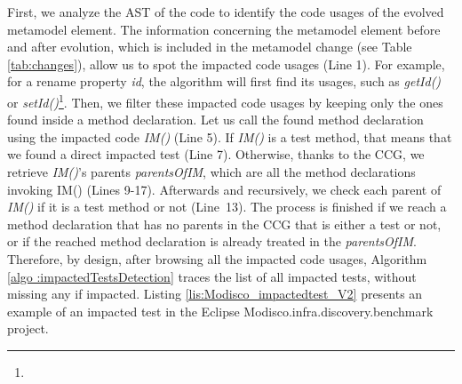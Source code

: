 First, we analyze the AST of the code to identify the code usages of the evolved metamodel element. The information concerning the metamodel element before and after evolution, which is included in the metamodel change (see Table \ref{tab:changes}), allow us to spot the impacted code usages (Line 1). For example, for a rename property \emph{id}, the algorithm will first find its usages, such as \emph{getId()} or \emph{setId()}\footnote{}. 
%
Then, we filter these impacted code usages by keeping only the ones found inside a method declaration. %
Let us call the found method declaration using the impacted code \textit{IM()} (Line 5). If \textit{IM()} is a test method, that means that we found a direct impacted test (Line 7). Otherwise, thanks to the CCG, we retrieve \textit{IM()}'s parents \emph{parentsOfIM}, which are all the method declarations invoking IM() (Lines 9-17). 
%
Afterwards and recursively, we check each parent of \textit{IM()} if it is a test method or not (Line~13). The process is finished if we reach a method declaration that has no parents in the CCG that is either a test or not, or if the reached method declaration is already treated in the \emph{parentsOfIM}. Therefore, by design, after browsing all the impacted code usages, Algorithm \ref{algo :impactedTestsDetection} traces the list of all impacted tests, without missing any if impacted.  
Listing \ref{lis:Modisco_impactedtest_V2} presents an example of an impacted test in the Eclipse Modisco.infra.discovery.benchmark project. 

